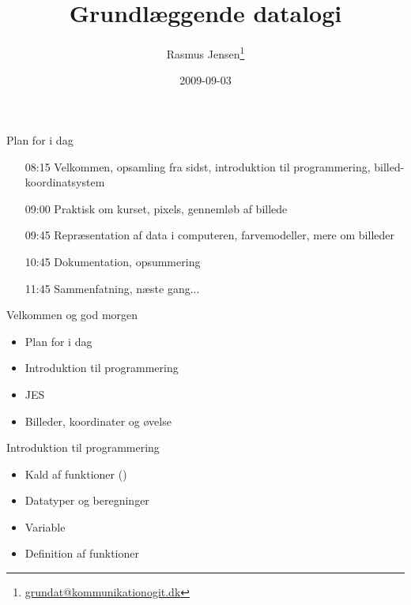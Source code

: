 \documentclass[a4paper,landscape]{slides}
\title{Grundlæggende datalogi}
\author{Rasmus Jensen\footnote{\url{grundat@kommunikationogit.dk}}}
\date{2009-09-03}
\begin{document}
\maketitle


\begin{slide}
	\begin{center} {\large 
            Plan for i dag
	} \end{center}
	\begin{itemize} \addtolength{\itemsep}{-\baselineskip}
    		\item[08:15] Velkommen, opsamling fra sidst, introduktion til programmering, billed-koordinatsystem
    		\item[09:00] Praktisk om kurset, pixels, gennemløb af billede
    		\item[09:45] Repræsentation af data i computeren, farvemodeller, mere om billeder
    		\item[10:45] Dokumentation, opsummering
    		\item[11:45] Sammenfatning, næste gang...
	\end{itemize}
\end{slide}

\begin{slide}
	\begin{center} {\large 
            Velkommen og god morgen
	} \end{center}
	\begin{itemize} \addtolength{\itemsep}{-\baselineskip}
		\item Plan for i dag
		\item Introduktion til programmering
		\item JES
                \item Billeder, koordinater og øvelse
	\end{itemize}
\end{slide}

\begin{slide}
	\begin{center} {\large 
            Introduktion til programmering
	} \end{center}
	\begin{itemize} \addtolength{\itemsep}{-\baselineskip}
		\item Kald af funktioner ()
		\item Datatyper og beregninger
		\item Variable
		\item Definition af funktioner
	\end{itemize}
\end{slide}
\end{document}

